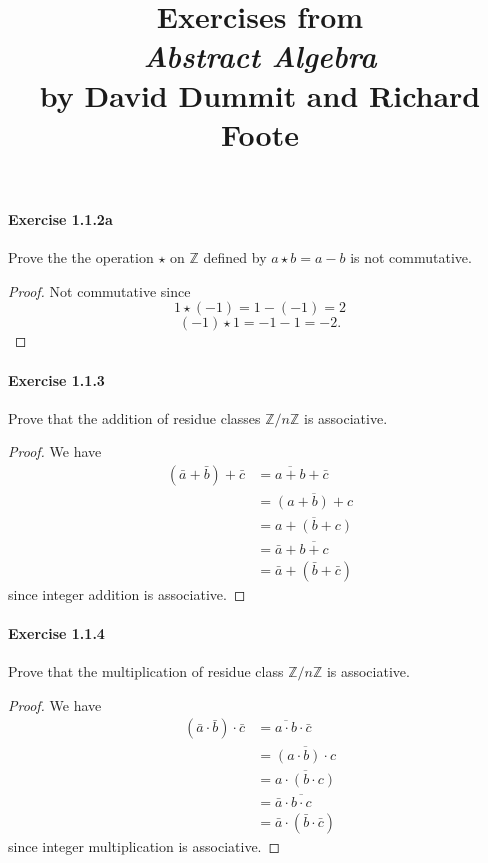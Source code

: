 \documentclass{article}
\title{\textbf{
Exercises from \\
\textit{Abstract Algebra} \\
by David Dummit and Richard Foote
}}
\date{}
\theoremstyle{definition}
\begin{document}
\maketitle


\paragraph{Exercise 1.1.2a} Prove the the operation $\star$ on $\mathbb{Z}$ defined by $a\star b=a-b$ is not commutative.
\begin{proof}
    Not commutative since
$$
1 \star(-1)=1-(-1)=2
$$
$$
(-1) \star 1=-1-1=-2 .
$$
\end{proof}



\paragraph{Exercise 1.1.3} Prove that the addition of residue classes $\mathbb{Z}/n\mathbb{Z}$ is associative.
\begin{proof}
    We have
$$
\begin{aligned}
(\bar{a}+\bar{b})+\bar{c} &=\overline{a+b}+\bar{c} \\
&=\overline{(a+b)+c} \\
&=\overline{a+(b+c)} \\
&=\bar{a}+\overline{b+c} \\
&=\bar{a}+(\bar{b}+\bar{c})
\end{aligned}
$$
since integer addition is associative.
\end{proof}



\paragraph{Exercise 1.1.4} Prove that the multiplication of residue class $\mathbb{Z}/n\mathbb{Z}$ is associative.
\begin{proof}
    We have
$$
\begin{aligned}
(\bar{a} \cdot \bar{b}) \cdot \bar{c} &=\overline{a \cdot b} \cdot \bar{c} \\
&=\overline{(a \cdot b) \cdot c} \\
&=\overline{a \cdot(b \cdot c)} \\
&=\bar{a} \cdot \overline{b \cdot c} \\
&=\bar{a} \cdot(\bar{b} \cdot \bar{c})
\end{aligned}
$$
since integer multiplication is associative.
\end{proof}
\end{document}
